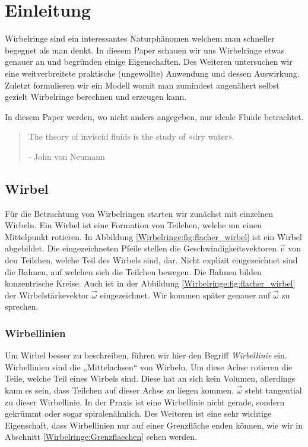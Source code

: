 %
%
%
\section{Einleitung}

Wirbelringe sind ein interessantes Naturphänomen welchem man schneller begegnet als man denkt. 
In diesem Paper schauen wir uns Wirbelringe etwas genauer an und begründen einige Eigenschaften. 
Des Weiteren untersuchen wir eine weitverbreitete praktische (ungewollte) Anwendung und dessen Auswirkung. 
Zuletzt formulieren wir ein Modell womit man zumindest angenähert selbst gezielt Wirbelringe berechnen und erzeugen kann.

In diesem Paper werden, wo nicht anders angegeben, nur ideale Fluide betrachtet.

\begin{quote}
    The theory of inviscid fluids is the study of «dry water».

    - John von Neumann \cite{Wirbelringe:feynman1964lectures}
\end{quote}

\subsection{Wirbel}



Für die Betrachtung von Wirbelringen starten wir zunächst mit einzelnen Wirbeln.
Ein Wirbel ist eine Formation von Teilchen, welche um einen Mittelpunkt rotieren.
In Abbildung \ref{Wirbelringe:fig:flacher_wirbel} ist ein Wirbel abgebildet.
Die eingezeichneten Pfeile stellen die Geschwindigkeitsvektoren \( \vec{v} \) von den Teilchen, welche Teil des Wirbels sind, dar.
Nicht explizit eingezeichnet sind die Bahnen, auf welchen sich die Teilchen bewegen.
Die Bahnen bilden konzentrische Kreise.
Auch ist in der Abbildung \ref{Wirbelringe:fig:flacher_wirbel} der Wirbelstärkevektor \(\vec{\omega}\) eingezeichnet.
Wir kommen später genauer auf \(\vec{\omega}\) zu sprechen.

\subsubsection*{Wirbellinien \label{Wirbelringe:Wirbellinien}}

Um Wirbel besser zu beschreiben, führen wir hier den Begriff {\em Wirbellinie} ein.
Wirbellinien sind die „Mittelachsen“ von Wirbeln. 
Um diese Achse rotieren die Teile, welche Teil eines Wirbels sind. 
Diese hat an sich kein Volumen, allerdings kann es sein, dass Teilchen auf dieser Achse zu liegen kommen. 
\(\vec{\omega}\) steht tangential zu dieser Wirbellinie.  
In der Praxis ist eine Wirbellinie nicht gerade, sondern gekrümmt oder sogar spiralenähnlich. 
Des Weiteren ist eine sehr wichtige Eigenschaft, dass Wirbellinien nur auf einer Grenzfläche enden können, 
wie wir in Abschnitt \ref{Wirbelringe:Grenzflaechen} sehen werden.

